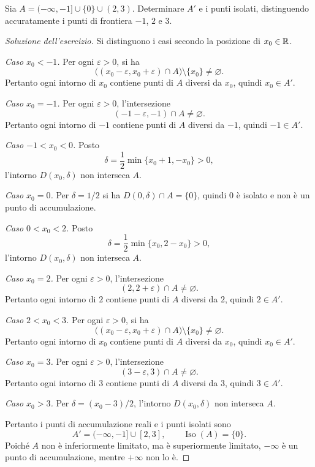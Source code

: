 \begin{exercise}
\label{ex:fondamenti-accumulazione-semiretta-isolato}
Sia $A=(-\infty,-1]\cup\{0\}\cup(2,3)$.
Determinare $A'$ e i punti isolati, distinguendo
accuratamente i punti di frontiera $-1$, $2$ e $3$.
\end{exercise}
\begin{proof}[Soluzione dell'esercizio]
Si distinguono i casi secondo la posizione di $x_0\in\mathbb{R}$.

\emph{Caso $x_0<-1$.} Per ogni $\varepsilon>0$,
si ha
\[
  \bigl((x_0-\varepsilon,x_0+\varepsilon)\cap A\bigr)
  \setminus\{x_0\}\ne\varnothing.
\]
Pertanto ogni intorno di $x_0$ contiene punti di
$A$ diversi da $x_0$, quindi $x_0\in A'$.

\emph{Caso $x_0=-1$.} Per ogni $\varepsilon>0$,
l'intersezione
\[
  (-1-\varepsilon,-1)\cap A\ne\varnothing.
\]
Pertanto ogni intorno di $-1$ contiene
punti di $A$ diversi da $-1$, quindi $-1\in A'$.

\emph{Caso $-1<x_0<0$.} Posto
\[
  \delta=\frac12\min\{x_0+1,-x_0\}>0,
\]
l'intorno $D(x_0,\delta)$ non interseca $A$.

\emph{Caso $x_0=0$.} Per $\delta=1/2$ si ha
$D(0,\delta)\cap A=\{0\}$, quindi $0$ è isolato
e non è un punto di accumulazione.

\emph{Caso $0<x_0<2$.} Posto
\[
  \delta=\frac12\min\{x_0,2-x_0\}>0,
\]
l'intorno $D(x_0,\delta)$ non interseca $A$.

\emph{Caso $x_0=2$.} Per ogni $\varepsilon>0$,
l'intersezione
\[
  (2,2+\varepsilon)\cap A\ne\varnothing.
\]
Pertanto ogni intorno di $2$ contiene
punti di $A$ diversi da $2$, quindi $2\in A'$.

\emph{Caso $2<x_0<3$.} Per ogni $\varepsilon>0$,
si ha
\[
  \bigl((x_0-\varepsilon,x_0+\varepsilon)\cap A\bigr)
  \setminus\{x_0\}\ne\varnothing.
\]
Pertanto ogni intorno di $x_0$ contiene punti di
$A$ diversi da $x_0$, quindi $x_0\in A'$.

\emph{Caso $x_0=3$.} Per ogni $\varepsilon>0$,
l'intersezione
\[
  (3-\varepsilon,3)\cap A\ne\varnothing.
\]
Pertanto ogni intorno di $3$ contiene
punti di $A$ diversi da $3$, quindi $3\in A'$.

\emph{Caso $x_0>3$.} Per $\delta=(x_0-3)/2$,
l'intorno $D(x_0,\delta)$ non interseca $A$.

Pertanto i punti di accumulazione reali e i punti isolati sono
\[
  A'=(-\infty,-1]\cup[2,3],
  \qquad \operatorname{Iso}(A)=\{0\}.
\]
Poiché $A$ non è inferiormente limitato, ma è
superiormente limitato, $-\infty$ è un punto di
accumulazione, mentre $+\infty$ non lo è.
\end{proof}

